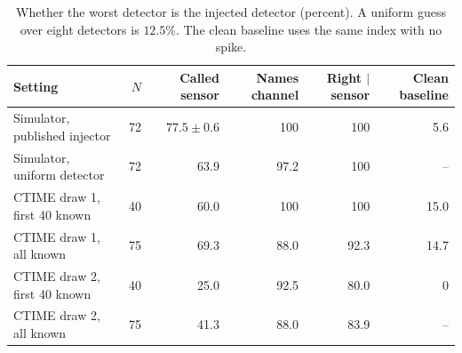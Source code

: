 \begin{table}[t]
\caption{Whether the worst detector is the injected detector (percent). A uniform guess over eight detectors is $12.5\%$. The clean baseline uses the same index with no spike.}
\label{tab:channel}
\centering
\small
\begin{tabular}{lrrrrr}
\toprule
Setting & $N$ & Called sensor & Names channel & Right $|$ sensor & Clean baseline \\
\midrule
Simulator, published injector & 72 & $77.5 \pm 0.6$ & 100 & 100 & 5.6 \\
Simulator, uniform detector & 72 & 63.9 & 97.2 & 100 & -- \\
CTIME draw 1, first 40 known & 40 & 60.0 & 100 & 100 & 15.0 \\
CTIME draw 1, all known & 75 & 69.3 & 88.0 & 92.3 & 14.7 \\
CTIME draw 2, first 40 known & 40 & 25.0 & 92.5 & 80.0 & 0 \\
CTIME draw 2, all known & 75 & 41.3 & 88.0 & 83.9 & -- \\
\bottomrule
\end{tabular}
\end{table}
